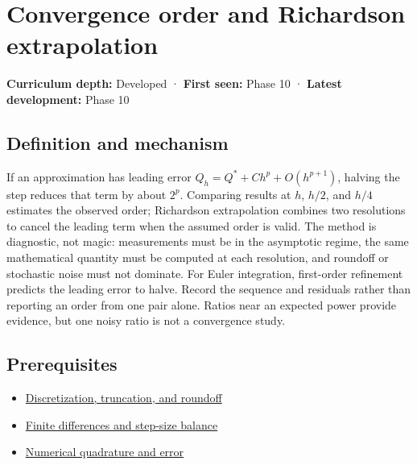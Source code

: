 \hypertarget{appendix-aca80b6bf17a}{}\label{referencestart:appendix-aca80b6bf17a}
\section{Convergence order and Richardson extrapolation}\label{appendix-aca80b6bf17a-convergence-order-and-richardson-extrapolation}

\textbf{Curriculum depth:} Developed · \textbf{First seen:} Phase 10 · \textbf{Latest development:} Phase 10

\begin{allmightroledefinition}

\subsection{Definition and mechanism}\label{appendix-aca80b6bf17a-definition-and-mechanism}

If an approximation has leading error \(Q_h=Q^*+Ch^p+O(h^{p+1})\), halving the step reduces that term by about \(2^p\). Comparing results at \(h\), \(h/2\), and \(h/4\) estimates the observed order; Richardson extrapolation combines two resolutions to cancel the leading term when the assumed order is valid. The method is diagnostic, not magic: measurements must be in the asymptotic regime, the same mathematical quantity must be computed at each resolution, and roundoff or stochastic noise must not dominate. For Euler integration, first-order refinement predicts the leading error to halve. Record the sequence and residuals rather than reporting an order from one pair alone. Ratios near an expected power provide evidence, but one noisy ratio is not a convergence study.

\end{allmightroledefinition}

\subsection{Prerequisites}\label{appendix-aca80b6bf17a-prerequisites}

\begin{itemize}
\tightlist
\item
  \hyperref[appendix-6b0648b2b8e8]{Discretization, truncation, and roundoff}
\item
  \hyperref[appendix-e2d7b4f2161d]{Finite differences and step-size balance}
\item
  \hyperref[appendix-80521eae6b71]{Numerical quadrature and error}
\end{itemize}

